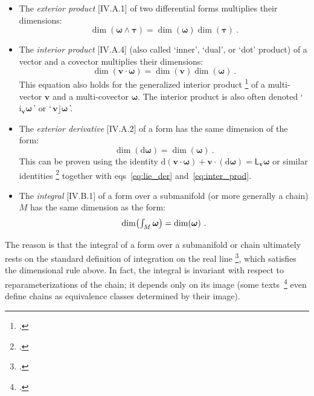 \documentclass[\ifafour a4paper,12pt,\else a5paper,10pt,\fi%
onecolumn,oneside,article,%
british%
]{memoir}
\newcommand*{\defquote}[1]{`#1'}
\newcommand*{\mathquote}[1]{`\,#1\,'}
\theoremstyle{remark}
\theoremstyle{innote}
\newcommand*{\citep}{\footcites}
\newcommand*{\di}{\mathrm{d}}%
\renewcommand*{\|}[1][]{\nonscript\,#1\vert\nonscript\;\mathopen{}}
\newcommand*{\sect}{\S}%
\newcommand*{\sects}{\S\S}%
\newcommand*{\chap}{ch.}%
\newcommand*{\eqns}{eqs}%
\newcommand*{\eg}{{e.g.}}
\newcommand*{\tint}{\begingroup\textstyle\int\endgroup\nolimits}
\newcommand*{\Li}{\textsf{L}}
\newcommand*{\ii}{\mathbin{\!\cdot\!}}
\newcommand*{\yom}{\bm{\omega}}
\newcommand*{\yta}{\bm{\tau}}
\newcommand*{\yv}{\bm{v}}
\begin{document}
\begin{itemize}[wide=0pt]
\item The \emph{exterior product} [IV.A.1] of two differential forms
  multiplies their dimensions:
  \begin{equation}
  \dim(\yom\land\yta) = \dim(\yom)\dim(\yta) \ .\label{eq:ext_prod}
\end{equation}
  
\item The \emph{interior product} [IV.A.4] (also called \defquote{inner},
  \defquote{dual}, or \defquote{dot} product) of a vector and a covector
  multiplies their dimensions:
  \begin{equation}
    \dim(\yv\ii\yom) =\dim(\yv)\dim(\yom) \ .
    \label{eq:inter_prod}
\end{equation}
This equation also holds for the generalized interior product
\citep{deschamps1970}[Appendices]{deschamps1981}{lindell2004}[\sect~F.I.267]{truesdelletal1960}[Box
4.1, item 4]{misneretal1970_r1973}[see also][]{portamana2019e} of a
multi-vector $\yv$ and a multi-covector $\yom$. The interior product is
also often denoted \mathquote{$\mathrm{i}_{\yv}\yom$} or
\mathquote{$\yv\mathbin{\!\rfloor\!}\yom$}.


\item The \emph{exterior derivative} [IV.A.2] of a form has the same
  dimension of the form:
  \begin{equation}
    \dim(\di\yom) =\dim(\yom) \ .
    \label{eq:ext_deriv}
  \end{equation}
  This can be proven using the identity
  $\di(\yv\ii\yom)+\yv\ii(\di\yom) = \Li_{\yv}\yom$ or similar identities
  \citep[\chap~9 p.~180 Theorem~9.78]{curtisetal1985}[\sect~6.4
  Theorem~6.4.8]{abrahametal1983_r1988} together with
  \eqns~\eqref{eq:lie_der} and~\eqref{eq:inter_prod}.

\item The \emph{integral} [IV.B.1] of a form over a submanifold (or more
  generally a chain) $M$ has the same dimension as the form:
  \begin{equation}
    \dim\bigl(\tint_{M}\yom\bigr) =\dim(\yom) \ .
    \label{eq:integration}
  \end{equation}
\end{itemize}
The reason is that the integral of a form over a submanifold or chain
ultimately rests on the standard definition of integration on the real line
\citep[\eg][\sects~IV.B.1--2]{choquetbruhatetal1977_r1996}[\sect~5 p.~21,
\sect~6
p.~24]{derham1955_t1984}[\sect~7.1]{abrahametal1983_r1988}[\sect~VI.2]{boothby1975_r2003},
which satisfies the dimensional rule above. In fact, the integral is
invariant with respect to reparameterizations of the chain; it depends only
on its image (some texts~\citep[\eg][\sect~10.4]{martin1991_r2004}[\sect~7.3]{fecko2006} even define chains as
equivalence classes determined by their image).
\end{document}
